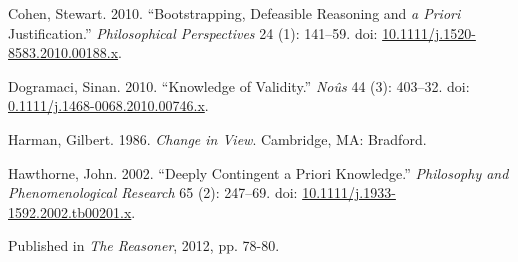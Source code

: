 \documentclass[
  11pt,
  letterpaper,
  DIV=11,
  numbers=noendperiod,
  twoside]{scrartcl}
\newlength{\cslhangindent}
\newenvironment{CSLReferences}[2] %
 {\begin{list}{}{%
  \setlength{\itemindent}{0pt}
  \setlength{\leftmargin}{0pt}
  \setlength{\parsep}{0pt}
  \ifodd #1
   \setlength{\leftmargin}{\cslhangindent}
   \setlength{\itemindent}{-1\cslhangindent}
  \fi
  \setlength{\itemsep}{#2\baselineskip}}}
 {\end{list}}
\begin{document}
\label{refs}
\begin{CSLReferences}{1}{0}
Cohen, Stewart. 2010. {``Bootstrapping, Defeasible Reasoning and \emph{a
Priori} Justification.''} \emph{Philosophical Perspectives} 24 (1):
141--59. doi:
\href{https://doi.org/10.1111/j.1520-8583.2010.00188.x}{10.1111/j.1520-8583.2010.00188.x}.

Dogramaci, Sinan. 2010. {``Knowledge of Validity.''} \emph{No{û}s} 44
(3): 403--32. doi:
\href{https://doi.org/0.1111/j.1468-0068.2010.00746.x}{0.1111/j.1468-0068.2010.00746.x}.

Harman, Gilbert. 1986. \emph{Change in View}. Cambridge, MA: Bradford.

Hawthorne, John. 2002. {``Deeply Contingent a Priori Knowledge.''}
\emph{Philosophy and Phenomenological Research} 65 (2): 247--69. doi:
\href{https://doi.org/10.1111/j.1933-1592.2002.tb00201.x}{10.1111/j.1933-1592.2002.tb00201.x}.

\end{CSLReferences}



\noindent Published in\emph{
The Reasoner}, 2012, pp. 78-80.
\end{document}
